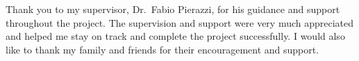 \noindent Thank you to my supervisor, Dr.\ Fabio Pierazzi, for his guidance and support throughout the project. The supervision and support were very much appreciated and helped me stay on track and complete the project successfully. I would also like to thank my family and friends for their encouragement and support.